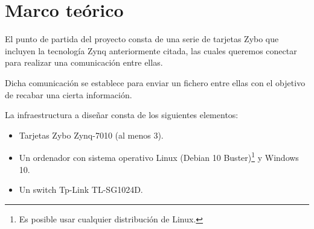 \section{Marco teórico}
El punto de partida del proyecto consta de una serie de tarjetas Zybo que incluyen la tecnología Zynq anteriormente citada, las cuales queremos conectar para realizar una comunicación entre ellas.

Dicha comunicación se establece para enviar un fichero entre ellas con el objetivo de recabar una cierta información.

La infraestructura a diseñar consta de los siguientes elementos:
\begin{itemize}
	\item Tarjetas Zybo Zynq-7010 (al menos 3).
	\item Un ordenador con sistema operativo Linux (Debian 10 Buster)\footnote{Es posible usar cualquier distribución de Linux.} y Windows 10.
	\item Un switch Tp-Link TL-SG1024D.
\end{itemize}